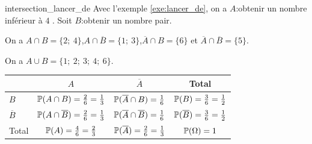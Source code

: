 \documentclass[10pt,a4paper,openany,twoside]{book}
\begin{document}
\begin{ex}{}{intersection_lancer_de}
   Avec l'exemple \ref{exe:lancer_de}, on a $A$:\og obtenir un nombre inférieur à $4$ \fg{}. Soit $B$:\og obtenir un nombre pair\fg{}.

   On a $A\cap B = \{2;~4\}$,\quad $A\cap \overline{B} = \{1;~3\}$,\quad $\overline{A}\cap B = \{6\}$ et \quad $\overline{A}\cap \overline{B} = \{5\}$.

   On a $A\cup B=\{1;~2;~3;~4;~6\}$.

  \begin{tabular}{|l|c|c|c|}
    \hline
     & $A$ & $\overline{A}$ & Total\\
    \hline
    $B$ & $\P(A\cap B)=\frac{2}{6}=\frac{1}{3}$ & $\P(\overline{A}\cap B)=\frac{1}{6}$ &$\P(B)=\frac{3}{6}=\frac{1}{2}$\\
    \hline
    $\overline{B}$ & $\P(A\cap \overline{B})=\frac{2}{6}=\frac{1}{3}$ & $\P(\overline{A}\cap \overline{B})=\frac{1}{6}$ & $\P(\overline{B})=\frac{3}{6}=\frac{1}{2}$\\
    \hline
    Total & $\P(A)=\frac{4}{6}=\frac{2}{3}$ & $\P(\overline{A})=\frac{2}{6}=\frac{1}{3}$ & $\P(\Omega)=1$ \\
    \hline
  \end{tabular}

\end{ex}
\end{document}
